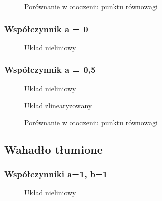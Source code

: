 \documentclass[a4paper, 10pt]{article}
\begin{document}
				\begin{figure}[H]
					\centering
					\def \svgwidth{0.75\columnwidth}
					
					\caption{Porównanie w otoczeniu punktu równowagi}
				\end{figure}\noindent

			\subsubsection{Współczynnik a = 0}
				\begin{figure}[H]
					\centering
					\def \svgwidth{0.75\columnwidth}
					
					\caption{Układ nieliniowy}
				\end{figure}\noindent


			\subsubsection{Współczynnik a = 0,5}
				\begin{figure}[H]
					\centering
					\def \svgwidth{0.75\columnwidth}
					
					\caption{Układ nieliniowy}
				\end{figure}\noindent


				\begin{figure}[H]
					\centering
					\def \svgwidth{0.75\columnwidth}
					
					\caption{Układ zlinearyzowany}
				\end{figure}\noindent


				\begin{figure}[H]
					\centering
					\def \svgwidth{0.75\columnwidth}
					
					\caption{Porównanie w otoczeniu punktu równowagi}
				\end{figure}\noindent

		\subsection{Wahadło tłumione}
			\subsubsection{Współczynniki a=1, b=1}
				\begin{figure}[H]
					\centering
					\def \svgwidth{0.75\columnwidth}
					
					\caption{Układ nieliniowy}
				\end{figure}\noindent
\end{document}
